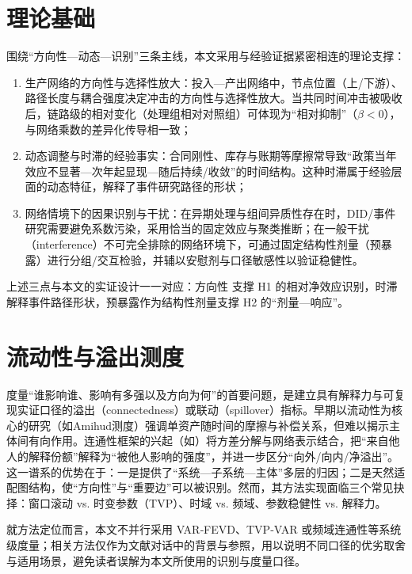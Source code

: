\section{理论基础}
围绕“方向性—动态—识别”三条主线，本文采用与经验证据紧密相连的理论支撑：
\begin{enumerate}
  \item 生产网络的方向性与选择性放大：投入—产出网络中，节点位置（上/下游）、路径长度与耦合强度决定冲击的方向性与选择性放大\citep{acemoglu2012network,carvalho2014micro}。当共同时间冲击被吸收后，链路级的相对变化（处理组相对对照组）可体现为“相对抑制”（$\beta<0$），与网络乘数的差异化传导相一致；
  \item 动态调整与时滞的经验事实：合同刚性、库存与账期等摩擦常导致“政策当年效应不显著—次年起显现—随后持续/收敛”的时间结构。这种时滞属于经验层面的动态特征，解释了事件研究路径的形状；
  \item 网络情境下的因果识别与干扰：在异期处理与组间异质性存在时，DID/事件研究需要避免系数污染，采用恰当的固定效应与聚类推断\citep{sun2021event,bertrand2004much,cameron2015practitioner,angrist2009mostly}；在一般干扰（interference）不可完全排除的网络环境下，可通过固定结构性剂量（预暴露）进行分组/交互检验，并辅以安慰剂与口径敏感性以验证稳健性\citep{aronow2017interference,athey2018network}。
\end{enumerate}

上述三点与本文的实证设计一一对应：方向性 \II 支撑 H1 的相对净效应识别，时滞解释事件路径形状，预暴露作为结构性剂量支撑 H2 的“剂量—响应”。
\section{流动性与溢出测度}
度量“谁影响谁、影响有多强以及方向为何”的首要问题，是建立具有解释力与可复现实证口径的溢出（connectedness）或联动（spillover）指标。早期以流动性为核心的研究（如Amihud测度）强调单资产随时间的摩擦与补偿关系，但难以揭示主体间有向作用。连通性框架的兴起（如\citep{billio2012econometric,diebold2012better,diebold2014connectedness}）将方差分解与网络表示结合，把“来自他人的解释份额”解释为“被他人影响的强度”，并进一步区分“向外/向内/净溢出”。这一谱系的优势在于：一是提供了“系统—子系统—主体”多层的归因；二是天然适配图结构，使“方向性”与“重要边”可以被识别。然而，其方法实现面临三个常见抉择：窗口滚动 vs. 时变参数（TVP）、时域 vs. 频域、参数稳健性 vs. 解释力。

就方法定位而言，本文不并行采用 VAR‑FEVD、TVP‑VAR 或频域连通性等系统级度量；相关方法仅作为文献对话中的背景与参照，用以说明不同口径的优劣取舍与适用场景，避免读者误解为本文所使用的识别与度量口径。

